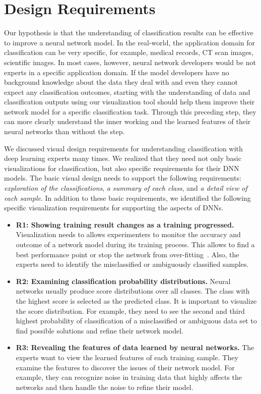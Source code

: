 

\section{Design Requirements}
\label{sec:design}

Our hypothesis is that the understanding of classification results can be effective to improve a neural network model.
In the real-world, the application domain for classification can be very specific, for example, medical records, CT scan images, scientific images.
In most cases, however, neural network developers would be not experts in a specific application domain.
If the model developers have no background knowledge about the data they deal with and even they cannot expect any classification outcomes, starting with the understanding of data and classification outputs using our visualization tool should help them improve their network model for a specific classification task.
Through this preceding step, they can more clearly understand the inner working and the learned features of their neural networks than without the step.

We discussed visual design requirements for understanding classification with deep learning experts many times.
We realized that they need not only basic visualizations for classification, but also specific requirements for their DNN models.
The basic visual design needs to support the following requirements: \textit{exploration of the classifications}, \textit{a summary of each class}, and \textit{a detail view of each sample}.
In addition to these basic requirements, we identified the following specific visualization requirements for supporting the aspects of DNNs.
\begin{itemize}
\item \textbf{R1: Showing training result changes as a training progressed.}
Visualization needs to allows experimenters to monitor the accuracy and outcome of a network model during its training process.
This allows to find a best performance point or stop the network from over-fitting~\cite{yeager2016effective}.
Also, the experts need to identify the misclassified or ambiguously classified samples.
\item \textbf{R2: Examining classification probability distributions.}
Neural networks usually produce score distributions over all classes.
The class with the highest score is selected as the predicted class.
It is important to visualize the score distribution.
For example, they need to see the second and third highest probability of classification of a misclassified or ambiguous data set to find possible solutions and refine their network model.
\item \textbf{R3: Revealing the features of data learned by neural networks.}
The experts want to view the learned features of each training sample.
They examine the features to discover the issues of their network model.
For example, they can recognize noise in training data that highly affects the networks and then handle the noise to refine their model.
\end{itemize}





